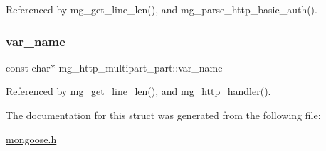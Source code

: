 Referenced by mg\+\_\+get\+\_\+line\+\_\+len(), and mg\+\_\+parse\+\_\+http\+\_\+basic\+\_\+auth().

\mbox{\label{structmg__http__multipart__part_af3c6e9825e31f000ec9e26c016eaa707_af3c6e9825e31f000ec9e26c016eaa707}} 
\subsubsection{\texorpdfstring{var\+\_\+name}{var\_name}}
{\footnotesize\ttfamily const char$\ast$ mg\+\_\+http\+\_\+multipart\+\_\+part\+::var\+\_\+name}



Referenced by mg\+\_\+get\+\_\+line\+\_\+len(), and mg\+\_\+http\+\_\+handler().



The documentation for this struct was generated from the following file\+:\begin{DoxyCompactItemize}
\item 
\hyperlink{mongoose_8h}{mongoose.\+h}\end{DoxyCompactItemize}
